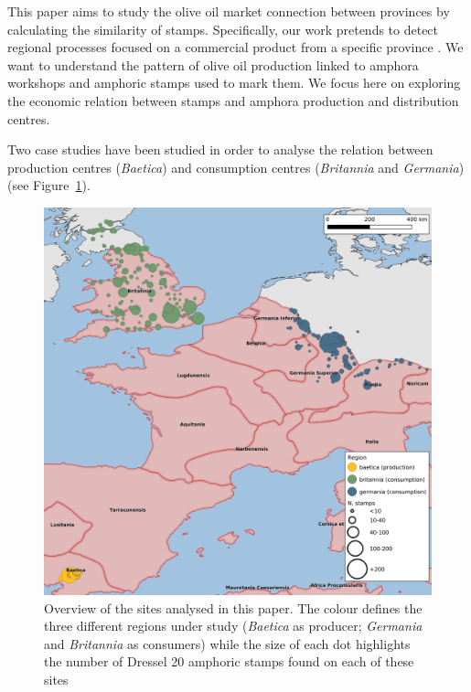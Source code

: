 \documentclass[review]{elsarticle}
\begin{document}
This paper aims to study the olive oil market connection between provinces by calculating the similarity of stamps. Specifically, our work pretends to detect regional processes focused on a commercial product from a specific province \citep{isaksen_network_2006}. We want to understand the pattern of olive oil production linked to amphora workshops and amphoric stamps used to mark them. We focus here on exploring the economic relation between stamps and amphora production and distribution centres. 

Two case studies have been studied in order to analyse the relation between production centres (\textit{Baetica}) and consumption centres (\textit{Britannia} and \textit{Germania}) (see Figure~\ref{general}).

\begin{figure}[htp]
	\centering
\includegraphics[width=\linewidth]{figs/general_map}
\caption{Overview of the sites analysed in this paper. The colour defines the three different regions under study (\textit{Baetica} as producer; \textit{Germania} and \textit{Britannia} as consumers) while the size of each dot highlights the number of Dressel 20 amphoric stamps found on each of these sites}

\label{general}
\end{figure} 
        
\end{document}
